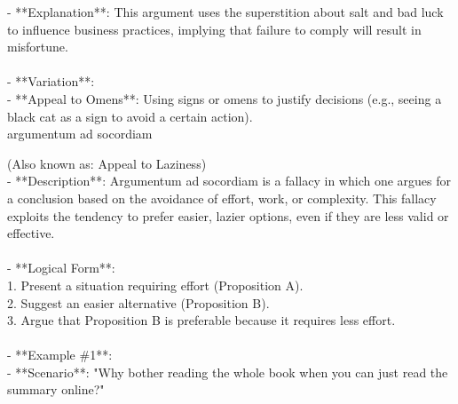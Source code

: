 \documentclass[a4paper,12pt,single,pdftex]{scrartcl}
\begin{document}
    
        - **Explanation**: This argument uses the superstition about salt and bad luck to influence business practices, implying that failure to comply will result in misfortune.
    \\

    
      
    \\

    
      - **Variation**:
    \\

    
        - **Appeal to Omens**: Using signs or omens to justify decisions (e.g., seeing a black cat as a sign to avoid a certain action).
    \\

  

argumentum ad socordiam
    
      (Also known as: Appeal to Laziness)
    \\

  
    
      - **Description**: Argumentum ad socordiam is a fallacy in which one argues for a conclusion based on the avoidance of effort, work, or complexity. This fallacy exploits the tendency to prefer easier, lazier options, even if they are less valid or effective.
    \\

    
      
    \\

    
      - **Logical Form**:
    \\

    
        1. Present a situation requiring effort (Proposition A).
    \\

    
        2. Suggest an easier alternative (Proposition B).
    \\

    
        3. Argue that Proposition B is preferable because it requires less effort.
    \\

    
      
    \\

    
      - **Example \#1**:
    \\

    
        - **Scenario**: "Why bother reading the whole book when you can just read the summary online?"
    \\
\end{document}
